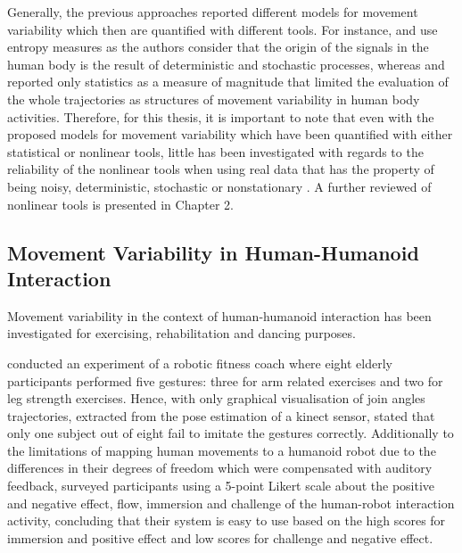 Generally, the previous approaches reported different models 
for movement variability which then are quantified with different tools.
For instance, \cite{hatze1986} and \cite{preatoni2010, preatoni2013} 
use entropy measures as the authors consider that the origin of the 
signals in the human body is the result of deterministic and 
stochastic processes, whereas 
\cite{muller2004} and \cite{seifert2011} reported only
statistics as a measure of magnitude that limited the evaluation of the 
whole trajectories as structures of movement variability in human body activities.
Therefore, for this thesis, it is important to note that
even with the proposed models for movement variability 
\citep{hatze1986, preatoni2010, preatoni2013, muller2004, seifert2011} 
which have been quantified with either statistical or nonlinear tools,
little has been investigated with regards to the reliability of the nonlinear 
tools when using real data that has the property of being noisy, deterministic,
stochastic or nonstationary \citep{newell1998}.
A further reviewed of nonlinear tools is presented in Chapter 2.





\subsection{Movement Variability in Human-Humanoid Interaction}


Movement variability in the context of human-humanoid interaction has been 
investigated for exercising, rehabilitation and dancing purposes. 

\cite{gorer2013} conducted an experiment of a robotic fitness coach 
where eight elderly participants performed five gestures: 
three for arm related exercises and two for leg strength exercises. 
Hence, \cite{gorer2013} with only graphical 
visualisation of join angles trajectories, extracted from the pose estimation
of a kinect sensor, 
stated that only one subject out of eight fail to imitate the gestures correctly.
Additionally to the limitations of mapping human movements to a humanoid robot
due to the differences in their degrees of freedom which were compensated 
with auditory feedback, \cite{gorer2013} surveyed 
participants using a 5-point Likert scale about the positive and negative effect, 
flow, immersion and challenge of the human-robot interaction activity, concluding 
that their system is easy to use based on the high scores for immersion and 
positive effect and low scores for challenge and negative effect.


